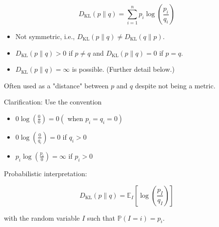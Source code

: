 \documentclass{report}
\begin{document}
\begin{theorem}
    $$
    D_{\mathrm{KL}}(p \| q)=\sum_{i=1}^{n} p_{i} \log \left(\frac{p_{i}}{q_{i}}\right)
    $$

    \begin{itemize}
        \item Not symmetric, i.e., $D_{\mathrm{KL}}(p \| q) \neq D_{\mathrm{KL}}(q \| p)$.
        \item $D_{\mathrm{KL}}(p \| q)>0$ if $p \neq q$ and $D_{\mathrm{KL}}(p \| q)=0$ if $p=q$.
        \item $D_{\mathrm{KL}}(p \| q)=\infty$ is possible. (Further detail below.)
    \end{itemize}

    Often used as a "distance" between $p$ and $q$ despite not being a metric.

    \par\noindent\textcolor{gray}{\hdashrule{\textwidth}{0.4pt}{1pt 2pt}}

    Clarification: Use the convention

    \begin{itemize}
        \item $0 \log \left(\frac{0}{0}\right)=0\left(\right.$ when $\left.p_{i}=q_{i}=0\right)$
        \item $0 \log \left(\frac{0}{q_{i}}\right)=0$ if $q_{i}>0$
        \item $p_{i} \log \left(\frac{p_{i}}{0}\right)=\infty$ if $p_{i}>0$
    \end{itemize}

    \par\noindent\textcolor{gray}{\hdashrule{\textwidth}{0.4pt}{1pt 2pt}}

    Probabilistic interpretation:

    $$
    D_{\mathrm{KL}}(p \| q)=\mathbb{E}_{I}\left[\log \left(\frac{p_{I}}{q_{I}}\right)\right]
    $$

    with the random variable $I$ such that $\mathbb{P}(I=i)=p_{i}$.
\end{theorem}
\end{document}
